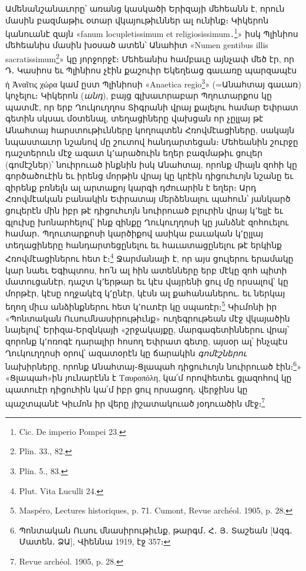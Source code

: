\documentclass{article}
\begin{document}
{Ամենանշանաւորը՝ առանց կասկածի Երիզայի մեհեանն է, որուն մասին բազմաթիւ օտար վկայութիւններ ալ ունինք։ Կիկերոն կանուանէ զայն «fanum locupletissimum et religiosissimum․\footnote{Cic. De imperio Pompei 23.}» իսկ Պլինիոս մեհեանիս մասին խօսած ատեն՝ Անահիտ «Numen gentibus illis sacratissimum\footnote{Plin. 33., 82.}» կը յորջորջէ։ Մեհեանիս համբաւը այնչափ մեծ էր, որ Դ․ Կասիոս եւ Պլինիոս չէին քաշուիր Եկեղեաց գաւառը պարզապէս ἡ Ἀναῖτις χώρα կամ ըստ Պլինիոսի «Anaetica regio\footnote{Plin. 5., 83.}» (=Անահտայ գաւառ) կոչելու։ Կիկերոն (\emph{անդ}), բայց գլխաւորաբար Պղուտարքոս կը պատմէ, որ երբ Ղուկուղղոս Տիգրանի վրայ քալելու համար Եփրատ գետին սկսաւ մօտենալ, տեղացիները վախցան որ չըլլայ թէ Անահտայ հարստութիւնները կողոպտեն Հռովմէացիները, սակայն նպաստաւոր նշանով մը շուտով հանդարտեցան։ Մեհեանին շուրջը դաշտերուն մէջ ազատ կ՚արածուին եղեր բազմաթիւ ցուլեր (գոմէշներ)՝ նուիրուած ինքնին իսկ Անահտայ, որոնք միայն զոհի կը գործածուէին եւ իրենց մորթին վրայ կը կրէին դիցուհւոյն նշանը եւ զիրենք բռնելն ալ արտաքոյ կարգի դժուարին է եղեր։ Արդ Հռովմէական բանակին Եփրատայ մերձենալու պահուն՝ յանկարծ ցուլերէն մին իբր թէ դիցուհւոյն նուիրուած բլուրին վրայ կ՚ելլէ եւ գլուխը խոնարհելով՝ ինք զինքը Ղուկուղղոսի կը յանձնէ զոհուելու համար․ Պղուտարքոսի կարծիքով ասիկա բաւական կ՚ըլլայ տեղացիները հանդարտեցընելու եւ հաւատացընելու թէ երկինք Հռովմէացիներու հետ է։\footnote{Plut. Vita Luculli 24.} Ջարմանալի է, որ այս ցուլերու երամակը կար նաեւ Եգիպտոս, հո՛ն ալ հին ատենները երբ մէկը զոհ պիտի մատուցանէր, դաշտ կ՚երթար եւ կէս վայրենի ցուլ մը որսալով՝ կը մորթէր, կէսը ողջակէզ կ՚ընէր, կէսն ալ քահանաներու․ եւ ներկայ եղող միւս անձինքներու հետ կ՚ուտէր կը սպառէր։\footnote{Maspéro, Lectures historiques, p. 71. Cumont, Revue archéol. 1905, p. 28.} Կիւմոնի իր «Պոնտական Ուսումնասիրութիւնք» ուղեգրութեան մէջ վկայածին նայելով՝ Երիզա֊Երզնկայի «շրջակայքը, մարգագետիններու վրայ՝ զորոնք կ՚ոռոգէ դարալիր հոսող Եփրատ գետը, այսօր ալ՝ ինչպէս Ղուկուղղոսի օրով՝ ազատօրէն կը ճարակին \emph{գոմէշներու} նախիրները, որոնք Անահտայ֊Ցլապահ դիցուհւոյն նուիրուած էին։\footnote{Պոնտական Ուսու մնասիրութիւնք, թարգմ․ Հ․ Յ․ Տաշեան [Ազգ․ Մատեն․ ՁԱ], Վիեննա 1919, էջ 357։}» «Ցլապահ»ին յունարէնն է Ταυροπόλη, կա՛մ որովհետեւ ցլազոհով կը պատուէր դիցուհին կա՛մ իբր ցուլ որսացող․ վերջինս կը պաշտպանէ Կիւմոն իր վերը յիշատակուած յօդուածին մէջ։\footnote{Revue archéol. 1905, p. 28.}

}
\end{document}
